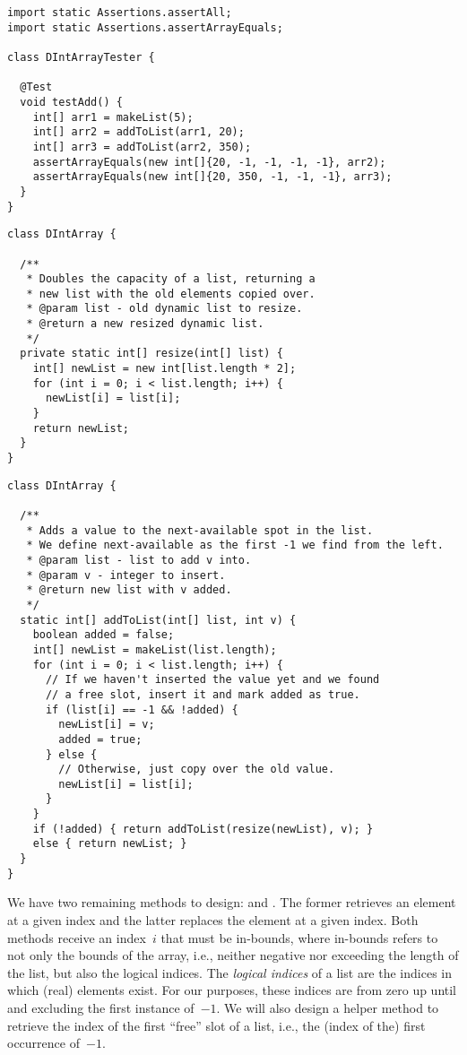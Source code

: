 \begin{lstlisting}[language=MyJava]
import static Assertions.assertAll;
import static Assertions.assertArrayEquals;

class DIntArrayTester {

  @Test
  void testAdd() {
    int[] arr1 = makeList(5);
    int[] arr2 = addToList(arr1, 20);
    int[] arr3 = addToList(arr2, 350);
    assertArrayEquals(new int[]{20, -1, -1, -1, -1}, arr2);
    assertArrayEquals(new int[]{20, 350, -1, -1, -1}, arr3);
  }
}
\end{lstlisting}

\begin{lstlisting}[language=MyJava]
class DIntArray {

  /**
   * Doubles the capacity of a list, returning a 
   * new list with the old elements copied over.
   * @param list - old dynamic list to resize.
   * @return a new resized dynamic list.
   */
  private static int[] resize(int[] list) {
    int[] newList = new int[list.length * 2];
    for (int i = 0; i < list.length; i++) {
      newList[i] = list[i];
    }
    return newList;
  }
}
\end{lstlisting}

\begin{lstlisting}[language=MyJava]
class DIntArray {

  /**
   * Adds a value to the next-available spot in the list.
   * We define next-available as the first -1 we find from the left.
   * @param list - list to add v into.
   * @param v - integer to insert.
   * @return new list with v added.
   */
  static int[] addToList(int[] list, int v) {
    boolean added = false;
    int[] newList = makeList(list.length);
    for (int i = 0; i < list.length; i++) {
      // If we haven't inserted the value yet and we found
      // a free slot, insert it and mark added as true.
      if (list[i] == -1 && !added) {
        newList[i] = v;
        added = true;
      } else {
        // Otherwise, just copy over the old value.
        newList[i] = list[i];
      }
    }
    if (!added) { return addToList(resize(newList), v); } 
    else { return newList; }
  }
}
\end{lstlisting}

We have two remaining methods to design:  and . 
The former retrieves an element at a given index and the latter replaces the element at a given index. 
Both methods receive an index~$i$ that must be in-bounds, where in-bounds refers to not only the bounds of the array, i.e., neither negative nor exceeding the length of the list, but also the logical indices. 
The \emph{logical indices} of a list are the indices in which (real) elements exist. 
For our purposes, these indices are from zero up until and excluding the first instance of~$-1$. We will also design a helper method to retrieve the index of the first ``free'' slot of a list, i.e., the (index of the) first occurrence of~$-1$.

